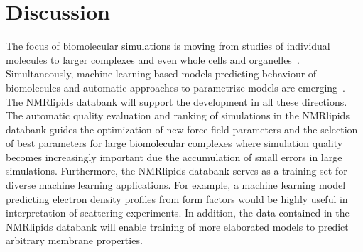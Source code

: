 \documentclass[fleqn,10pt]{wlscirep}
\begin{document}
\section{Discussion}


The focus of biomolecular simulations is moving from studies of individual molecules to larger complexes and even whole cells and organelles~\cite{johnson15,thornburg22,gupta22}. Simultaneously, machine learning based models predicting behaviour of biomolecules and automatic approaches to parametrize models are emerging~\cite{jumper21,antila22b}. The NMRlipids databank will support the development in all these directions. The automatic quality evaluation and ranking of simulations in the NMRlipids databank guides the optimization of new force field parameters and the selection of best parameters for large biomolecular complexes where simulation quality becomes increasingly important due the accumulation of small errors in large simulations. Furthermore, the NMRlipids databank serves as a training set for diverse machine learning applications. For example, a machine learning model predicting electron density profiles from form factors would be highly useful in interpretation of scattering experiments. In addition, the data contained in the NMRlipids databank will enable training of more elaborated models to predict arbitrary membrane properties. 
\end{document}
